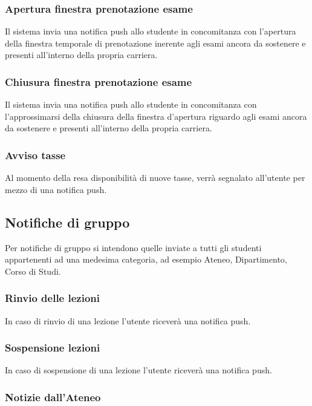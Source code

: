 \subsubsection{Apertura finestra prenotazione esame}

Il sistema invia una notifica push allo studente in concomitanza con l’apertura della finestra temporale di prenotazione inerente agli esami ancora da sostenere e presenti all’interno della propria carriera.

\subsubsection{Chiusura finestra prenotazione esame}

Il sistema invia una notifica push allo studente in concomitanza con l’approssimarsi della chiusura della finestra d’apertura riguardo agli esami ancora da sostenere e presenti all’interno della propria carriera.

\subsubsection{Avviso tasse}

Al momento della resa disponibilità di nuove tasse, verrà segnalato all’utente per mezzo di una notifica push.

\subsection{Notifiche di gruppo}

Per notifiche di gruppo si intendono quelle inviate a tutti gli studenti appartenenti ad una medesima categoria, ad esempio Ateneo, Dipartimento, Corso di Studi.

\subsubsection{Rinvio delle lezioni}

In caso di rinvio di una lezione l’utente riceverà una notifica push.

\subsubsection{Sospensione lezioni}

In caso di sospensione di una lezione l’utente riceverà una notifica push.

\subsubsection{Notizie dall'Ateneo}

